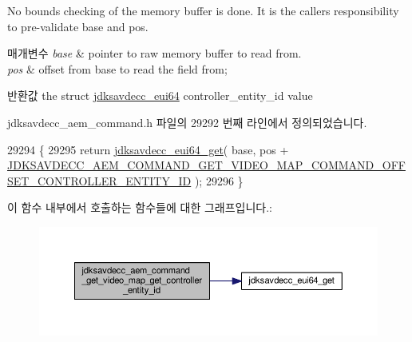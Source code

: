 No bounds checking of the memory buffer is done. It is the caller\textquotesingle{}s responsibility to pre-\/validate base and pos.


\begin{DoxyParams}{매개변수}
{\em base} & pointer to raw memory buffer to read from. \\
\hline
{\em pos} & offset from base to read the field from; \\
\hline
\end{DoxyParams}
\begin{DoxyReturn}{반환값}
the struct \hyperlink{structjdksavdecc__eui64}{jdksavdecc\+\_\+eui64} controller\+\_\+entity\+\_\+id value 
\end{DoxyReturn}


jdksavdecc\+\_\+aem\+\_\+command.\+h 파일의 29292 번째 라인에서 정의되었습니다.


\begin{DoxyCode}
29294 \{
29295     \textcolor{keywordflow}{return} \hyperlink{group__eui64_ga2652311a25a6b91cddbed75c108c7031}{jdksavdecc\_eui64\_get}( base, pos + 
      \hyperlink{group__command__get__video__map_ga764aca87a9928164ca46b885e83fe79e}{JDKSAVDECC\_AEM\_COMMAND\_GET\_VIDEO\_MAP\_COMMAND\_OFFSET\_CONTROLLER\_ENTITY\_ID}
       );
29296 \}
\end{DoxyCode}


이 함수 내부에서 호출하는 함수들에 대한 그래프입니다.\+:
\nopagebreak
\begin{figure}[H]
\begin{center}
\leavevmode
\includegraphics[width=350pt]{group__command__get__video__map_gab553a9add65f2fde36e1f09962840d7f_cgraph}
\end{center}
\end{figure}


